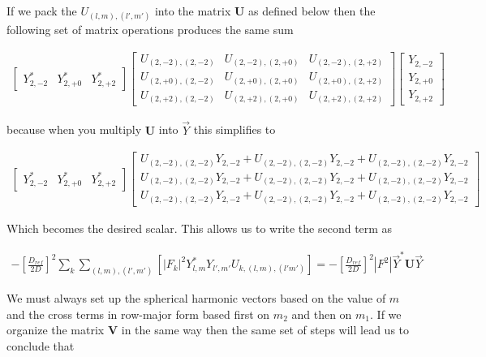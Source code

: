 \documentclass[paper=a4, fontsize=11pt]{scrartcl} %
\numberwithin{equation}{section} %
\numberwithin{figure}{section} %
\numberwithin{table}{section} %
\begin{document}
If we pack the $U_{(l,m),(l',m')}$ into the matrix $\mathbf{U}$ as defined below then the following set of matrix operations produces the same sum

\begin{align*}
\begin{bmatrix}
Y_{2,-2}^{*} &Y_{2,+0}^{*}  &Y_{2,+2}^{*}   
\end{bmatrix}
\begin{bmatrix}
U_{(2,-2),(2,-2)} &  U_{(2,-2),(2,+0)} &  U_{(2,-2),(2,+2)} \\
U_{(2,+0),(2,-2)} &  U_{(2,+0),(2,+0)} &  U_{(2,+0),(2,+2)} \\
U_{(2,+2),(2,-2)} &  U_{(2,+2),(2,+0)} &  U_{(2,+2),(2,+2)}
\end{bmatrix}
\begin{bmatrix}
Y_{2,-2} \\
Y_{2,+0} \\
Y_{2,+2}
\end{bmatrix}
\end{align*}

because when you multiply $\mathbf{U}$ into $\vec{Y}$ this simplifies to 



\begin{align*}
\begin{bmatrix}
Y_{2,-2}^{*} &Y_{2,+0}^{*}  &Y_{2,+2}^{*}   
\end{bmatrix}
\begin{bmatrix}
U_{(2,-2),(2,-2)} Y_{2,-2} + U_{(2,-2),(2,-2)}Y_{2,-2} + U_{(2,-2),(2,-2)}Y_{2,-2} \\ 
U_{(2,-2),(2,-2)} Y_{2,-2} + U_{(2,-2),(2,-2)}Y_{2,-2} + U_{(2,-2),(2,-2)}Y_{2,-2} \\ 
U_{(2,-2),(2,-2)} Y_{2,-2} + U_{(2,-2),(2,-2)}Y_{2,-2} + U_{(2,-2),(2,-2)}Y_{2,-2} 
\end{bmatrix}
\end{align*}

Which becomes the desired scalar. This allows us to write the second term as

\begin{align}
- \left[\frac{D_{ref}}{2D}\right]^{2}\sum_{k}\sum_{(l,m),(l',m')}\left[|F_k|^2 Y_{l,m}^{*}Y_{l',m'}U_{k,(l,m),(l'm')}\right] =  - \left[\frac{D_{ref}}{2D}\right]^{2} |F^2|\vec{Y}^{*}\mathbf{U}\vec{Y}
\end{align}

We must always set up the spherical harmonic vectors based on the value of $m$ and the cross terms in row-major form based first on $m_2$ and then on $m_1$. If we organize the matrix $\mathbf{V}$ in the same way then the same set of steps will lead us to conclude that  
\end{document}
